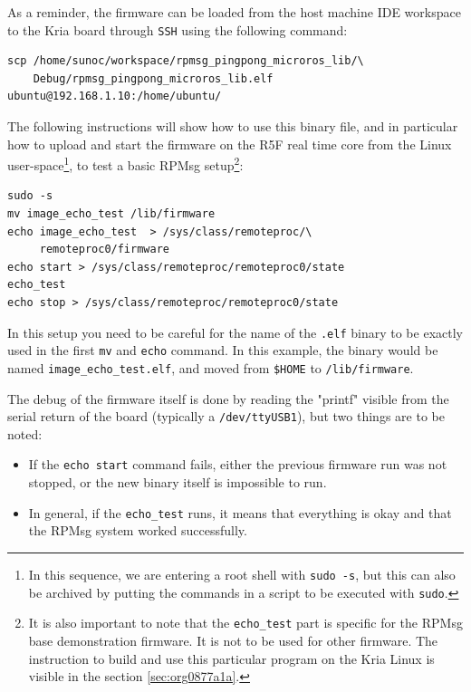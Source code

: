 \documentclass[10pt]{article}
\begin{document}
As a reminder, the firmware can be loaded from the host machine IDE workspace
to the Kria board through \texttt{SSH} using the following command:
\begin{verbatim}
scp /home/sunoc/workspace/rpmsg_pingpong_microros_lib/\
    Debug/rpmsg_pingpong_microros_lib.elf  ubuntu@192.168.1.10:/home/ubuntu/
\end{verbatim}

The following instructions will show how to use this binary file, and
in particular how to upload and start the firmware on the R5F real time core
from the Linux user-space\footnote{In this sequence, we are entering a root shell with \texttt{sudo -s}, but this can
also be archived by putting the commands in a script to be executed with \texttt{sudo}.}, to test a basic RPMsg setup\footnote{It is also important to note that the \texttt{echo\_test} part is specific for the
RPMsg base demonstration firmware. It is not to be used for other firmware.
The instruction to build and use this particular program on the Kria Linux
is visible in the section \ref{sec:org0877a1a}.}:
\begin{verbatim}
sudo -s
mv image_echo_test /lib/firmware
echo image_echo_test  > /sys/class/remoteproc/\
     remoteproc0/firmware
echo start > /sys/class/remoteproc/remoteproc0/state
echo_test
echo stop > /sys/class/remoteproc/remoteproc0/state
\end{verbatim}

In this setup you need to be careful for the name of the \texttt{.elf} binary to be exactly used
in the first \texttt{mv} and \texttt{echo} command. In this example, the binary would be named
\texttt{image\_echo\_test.elf}, and moved from \texttt{\$HOME} to \texttt{/lib/firmware}.

The debug of the firmware itself is done by reading the "printf" visible from the serial
return of the board (typically a \texttt{/dev/ttyUSB1}), but two things are to be noted:
\begin{itemize}
\item If the \texttt{echo start} command fails, either the previous firmware run was not stopped,
or the new binary itself is impossible to run.
\item In general, if the \texttt{echo\_test} runs, it means that everything is okay and that
the RPMsg system worked successfully.
\end{itemize}
\pagebreak
\end{document}
